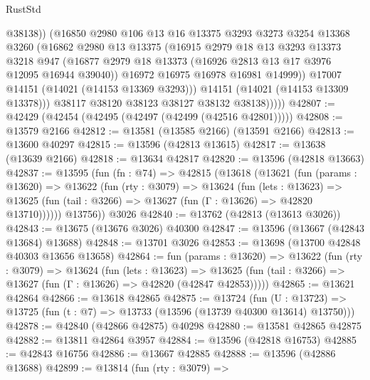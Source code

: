 \begin{lexlean}{RustStd}
\begin{coremodule}
                    @38138))
                (@16850
                  @2980
                  @106
                  @13
                  @16
                  @13375
                  @3293
                  @3273
                  @3254
                  @13368
                  @3260
                  (@16862
                    @2980
                    @13
                    @13375
                    (@16915
                      @2979
                      @18
                      @13
                      @3293
                      @13373
                      @3218
                      @947
                      (@16877 @2979 @18 @13373 (@16926 @2813 @13 @17 @3976 @12095 @16944 @39040))
                      @16972
                      @16975
                      @16978
                      @16981
                      @14999))
                  @17007
                  @14151
                  (@14021 (@14153 @13369 @3293)))
                @14151
                (@14021 (@14153 @13309 @13378)))
              @38117
              @38120
              @38123
              @38127
              @38132
              @38138)))))
@42807 := @42429 (@42454 (@42495 (@42497 (@42499 (@42516 @42801)))))
@42808 := @13579 @2166
@42812 := @13581 (@13585 @2166) (@13591 @2166)
@42813 := @13600 @40297
@42815 := @13596 (@42813 @13615)
@42817 := @13638 (@13639 @2166)
@42818 := @13634 @42817
@42820 := @13596 (@42818 @13663)
@42837 := @13595
    (fun (fn : @74) =>
    @42815
      (@13618
        (@13621
          (fun (params : @13620) =>
          @13622
            (fun (rty : @3079) =>
            @13624
              (fun (lets : @13623) =>
              @13625 (fun (tail : @3266) => @13627 (fun (Γ : @13626) => @42820 @13710))))))
        @13756))
    @3026
@42840 := @13762 (@42813 (@13613 @3026))
@42843 := @13675 (@13676 @3026) @40300
@42847 := @13596 (@13667 (@42843 @13684) @13688)
@42848 := @13701 @3026
@42853 := @13698 (@13700 @42848 @40303 @13656 @13658)
@42864 := fun (params : @13620) =>
  @13622
    (fun (rty : @3079) =>
    @13624
      (fun (lets : @13623) =>
      @13625 (fun (tail : @3266) => @13627 (fun (Γ : @13626) => @42820 (@42847 @42853)))))
@42865 := @13621 @42864
@42866 := @13618 @42865
@42875 := @13724
    (fun (U : @13723) => @13725 (fun (t : @7) => @13733 (@13596 (@13739 @40300 @13614) @13750)))
@42878 := @42840 (@42866 @42875) @40298
@42880 := @13581 @42865 @42875
@42882 := @13811 @42864 @3957
@42884 := @13596 (@42818 @16753)
@42885 := @42843 @16756
@42886 := @13667 @42885
@42888 := @13596 (@42886 @13688)
@42899 := @13814
    (fun (rty : @3079) =>

\end{coremodule}
\end{lexlean}
